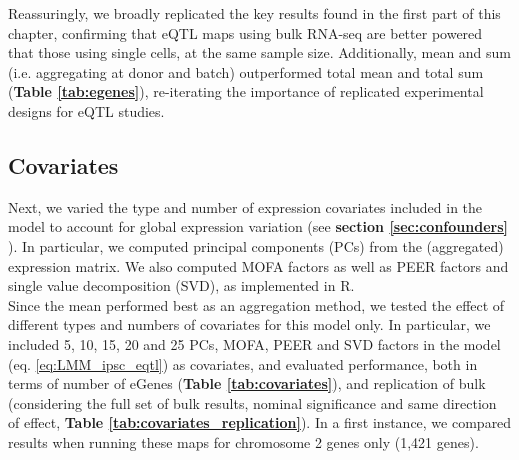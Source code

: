 Reassuringly, we broadly replicated the key results found in the first part of this chapter, confirming that eQTL maps using bulk RNA-seq are better powered that those using single cells, at the same sample size.
Additionally, mean and sum (i.e. aggregating at donor and batch) outperformed total mean and total sum (\textbf{Table \ref{tab:egenes}}), re-iterating the importance of replicated experimental designs for eQTL studies.



\subsection{Covariates}


Next, we varied the type and number of expression covariates included in the model to account for global expression variation (see \textbf{section 
\ref{sec:confounders}
}).
In particular, we computed principal components (PCs) from the (aggregated) expression matrix.
We also computed MOFA factors \cite{argelaguet2018multi} as well as PEER factors \cite{stegle2010bayesian,stegle2012using} and single value decomposition (SVD), as implemented in R. \\

Since the mean performed best as an aggregation method, we tested the effect of different types and numbers of covariates for this model only.
In particular, we included 5, 10, 15, 20 and 25 PCs, MOFA, PEER and SVD factors in the model (eq. \eqref{eq:LMM_ipsc_eqtl}) as covariates, and evaluated performance, both in terms of number of eGenes (\textbf{Table \ref{tab:covariates}}), and replication of bulk (considering the full set of bulk results, nominal significance and same direction of effect, \textbf{Table \ref{tab:covariates_replication}}).
In a first instance, we compared results when running these maps for chromosome 2 genes only (1,421 genes). \\


